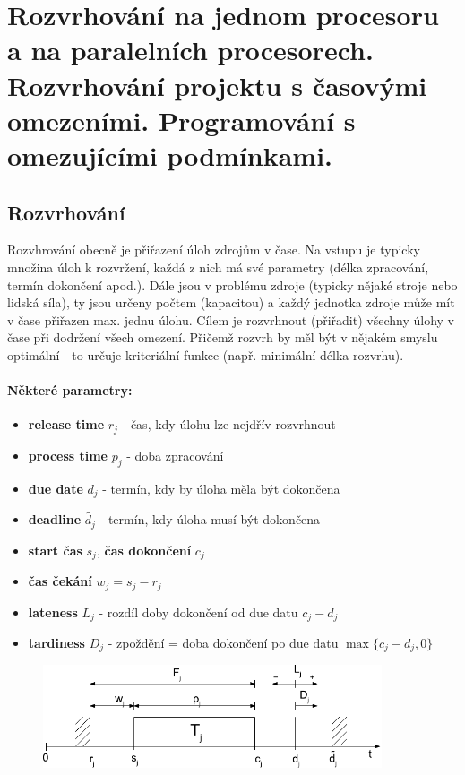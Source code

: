 \section[KO - Scheduling]{Rozvrhování na jednom procesoru a na paralelních procesorech. Rozvrhování projektu s časovými omezeními. Programování s omezujícími podmínkami.}


\subsection{Rozvrhování}
Rozvhrování obecně je přiřazení úloh zdrojům v čase. Na vstupu je typicky množina úloh k rozvržení, každá z nich má své parametry (délka zpracování, termín dokončení apod.). Dále jsou v problému zdroje (typicky nějaké stroje nebo lidská síla), ty jsou určeny počtem (kapacitou) a každý jednotka zdroje může mít v čase přiřazen max. jednu úlohu. Cílem je rozvrhnout (přiřadit) všechny úlohy v čase při dodržení všech omezení. Přičemž rozvrh by měl být v nějakém smyslu optimální - to určuje kriteriální funkce (např. minimální délka rozvrhu).

\paragraph{Některé parametry:}
\begin{itemize}[itemsep=0px]
\item \textbf{release time} $r_j$ - čas, kdy úlohu lze nejdřív rozvrhnout
\item \textbf{process time} $p_j$ - doba zpracování
\item \textbf{due date} $d_j$ - termín, kdy by úloha měla být dokončena
\item \textbf{deadline} $\widetilde{d_j}$ - termín, kdy úloha musí být dokončena
\item \textbf{start čas} $s_j$, \textbf{čas dokončení} $c_j$
\item \textbf{čas čekání} $w_j = s_j - r_j$
\item \textbf{lateness} $L_j$ - rozdíl doby dokončení od due datu $c_j - d_j$
\item \textbf{tardiness} $D_j$ - zpoždění = doba dokončení po due datu $\max\{c_j - d_j,0\}$
\end{itemize}

\begin{figure}[h]
    \begin{center}
        \includegraphics[width=100mm]{spolecne/10/images/scheduling-params}
    \end{center}
\end{figure}

